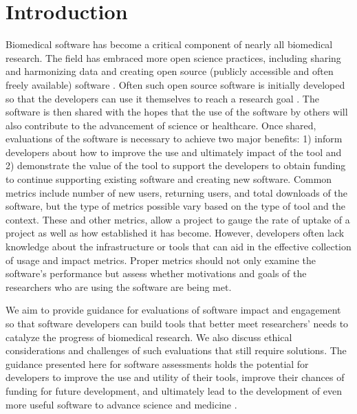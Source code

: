 \documentclass{article}
\begin{document}


\section{Introduction} Biomedical software has become a critical component of nearly all biomedical research. The field has embraced more open science practices, including sharing and harmonizing data and creating open source (publicly accessible and often freely available) software \cite{green_strategic_2020, levet_developing_2021, itcr_open-source_2021}. Often such open source software is initially developed so that the developers can use it themselves to reach a research goal \cite{bitzer_intrinsic_2007}. The software is then shared with the hopes that the use of the software by others will also contribute to the advancement of science or healthcare. Once shared, evaluations of the software is necessary to achieve two major benefits: 1) inform developers about how to improve the use and ultimately impact of the tool and 2) demonstrate the value of the tool to support the developers to obtain funding to continue supporting existing software and creating new software. Common metrics include number of new users, returning users, and total downloads of the software, but the type of metrics possible vary based on the type of tool and the context. These and other metrics, allow a project to gauge the rate of uptake of a project as well as how established it has become. However, developers often lack knowledge about the infrastructure or tools that can aid in the effective collection of usage and impact metrics. Proper metrics should not only examine the software's performance but assess whether motivations and goals of the researchers who are using the software are being met.

We aim to provide guidance for evaluations of software impact and engagement so that software developers can build tools that better meet researchers' needs to catalyze the progress of biomedical research. We also discuss ethical considerations and challenges of such evaluations that still require solutions. The guidance presented here for software assessments holds the potential for developers to improve the use and utility of their tools, improve their chances of funding for future development, and ultimately lead to the development of even more useful software to advance science and medicine \cite{wratten_reproducible_2021}. 
\end{document}
